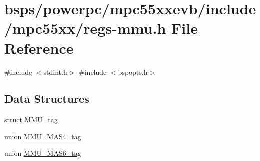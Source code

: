 \hypertarget{regs-mmu_8h}{}\section{bsps/powerpc/mpc55xxevb/include/mpc55xx/regs-\/mmu.h File Reference}
\label{regs-mmu_8h}
{\ttfamily \#include $<$stdint.\+h$>$}\newline
{\ttfamily \#include $<$bspopts.\+h$>$}\newline
\subsection*{Data Structures}
\begin{DoxyCompactItemize}
\item 
struct \mbox{\hyperlink{structMMU__tag}{M\+M\+U\+\_\+tag}}
\item 
union \mbox{\hyperlink{unionMMU__MAS4__tag}{M\+M\+U\+\_\+\+M\+A\+S4\+\_\+tag}}
\item 
union \mbox{\hyperlink{unionMMU__MAS6__tag}{M\+M\+U\+\_\+\+M\+A\+S6\+\_\+tag}}
\end{DoxyCompactItemize}
